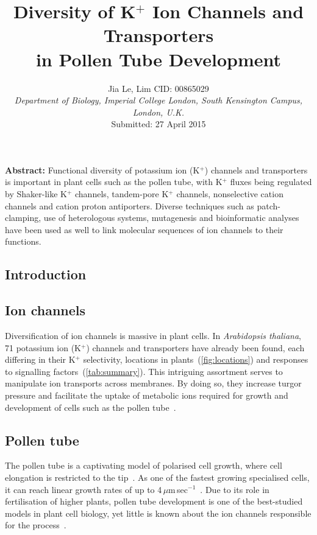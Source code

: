 \documentclass[11pt]{article}
\title{\textbf{\huge{Diversity of K$^{+}$ Ion Channels and Transporters \\ \vspace{0.2cm}
in Pollen Tube Development}}}
\date{}
\author{%
\large{ Jia Le, Lim {  } CID: 00865029 } \\
\textnormal
{\textit{Department of Biology, Imperial College London, South Kensington Campus, London, U.K.}} \\
Submitted: 27 April 2015
}
\makeatletter
\renewcommand{\maketitle}{\bgroup\setlength{\parindent}{0pt}
\begin{flushleft}
  \textbf{\@title} %
  
  \@author
\end{flushleft}\egroup
}
\makeatother
\begin{document}
\maketitle
\bigskip
\textbf{Abstract:}  \textnormal Functional diversity of potassium ion (K$^{+}$) channels and transporters is important in plant cells such as the pollen tube, with K$^{+}$ fluxes being regulated by Shaker-like K$^{+}$ channels, tandem-pore K$^{+}$ channels, nonselective cation channels and cation proton antiporters. Diverse techniques such as patch-clamping, use of heterologous systems, mutagenesis and bioinformatic analyses have been used as well to link molecular sequences of ion channels to their functions. 

\begin{multicols*}{2} %
\tableofcontents

\section{Introduction} 
\subsection{Ion channels}
Diversification of ion channels is massive in plant cells. In \textit{Arabidopsis thaliana}, 71 potassium ion (K$^{+}$) channels and transporters have already been found, each differing in their K$^{+}$ selectivity, locations in plants~(\autoref{fig:locations}) and responses to signalling factors~(\autoref{tab:summary}). 
This intriguing assortment serves to manipulate ion transports across membranes. By doing so, they increase turgor pressure and facilitate the uptake of metabolic ions required for growth and development of cells such as the pollen tube~\citep{Sharma2013}. 

\subsection{Pollen tube}
The pollen tube is a captivating model of polarised cell growth, where cell elongation is restricted to the tip~\citep{Feijo1995}. As one of the fastest growing specialised cells, it can reach linear growth rates of up to 4\,$\mu$m\,sec$^{-1}$~\citep{Michard2009}. Due to its role in fertilisation of higher plants, pollen tube development is one of the best-studied models in plant cell biology, yet little is known about the ion channels responsible for the process~\citep{Becker2003}. 


\end{multicols*}
\end{document}

